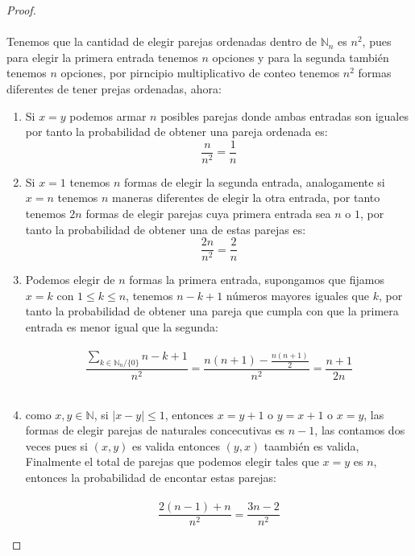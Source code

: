 \documentclass[11pt,letterpaper]{article}
\newcommand{\N}{\mathbb{N}}
\begin{document}
\begin{proof}\,\\
    \,\\
    Tenemos que la cantidad de elegir parejas ordenadas dentro de $\N_n$ es $n^2$, pues para elegir la primera entrada tenemos $n$ opciones y para la segunda
    tambi\'en tenemos $n$ opciones, por pirncipio multiplicativo de conteo tenemos $n^2$ formas diferentes de tener prejas ordenadas, ahora:\,\\
    \begin{enumerate}
        \item Si $x=y$ podemos armar $n$ posibles parejas donde ambas entradas son iguales por tanto la probabilidad de obtener una pareja ordenada es:\,\\
        \begin{equation*}
            \frac{n}{n^2}=\frac{1}{n}
        \end{equation*}
        \item Si $x=1$ tenemos $n$ formas de elegir la segunda entrada, analogamente si $x=n$ tenemos $n$ maneras diferentes de elegir la otra entrada, por tanto
        tenemos $2n$ formas de elegir parejas cuya primera entrada sea $n$ o $1$, por tanto la probabilidad de obtener una de estas parejas es:\,\\
        \begin{equation*}
            \frac{2n}{n^2}=\frac{2}{n}
        \end{equation*}
        \item Podemos elegir de $n$ formas la primera entrada, supongamos que fijamos $x=k$ con $1\leq k\leq n$, tenemos $n-k+1$ n\'umeros mayores iguales que $k$, por tanto la probabilidad de obtener una pareja 
        que cumpla con que la primera entrada es menor igual que la segunda:\,\\
        \,\\
        \begin{equation*}
            \frac{\displaystyle \sum_{k\in \N_n/\{0\}}n-k+1}{n^2}=\frac{n(n+1)-\frac{n(n+1)}{2}}{n^2}=\frac{n+1}{2n}
        \end{equation*}\,\\
        \item como $x,y\in \N$, si $|x-y|\leq 1$, entonces $x=y+1$ o $y=x+1$ o $x=y$, las formas de elegir parejas de naturales concecutivas es $n-1$, las contamos dos veces pues si $(x,y)$ es valida entonces $(y,x)$ taambi\'en es valida, Finalmente
        el total de parejas que podemos elegir tales que $x=y$ es $n$, entonces la probabilidad de encontar estas parejas:\,\\
        \,\\
        \begin{equation*}
            \frac{2(n-1)+n}{n^2}=\frac{3n-2}{n^2}
        \end{equation*}    
    \end{enumerate}
    
\end{proof}\,\\
\end{document}
